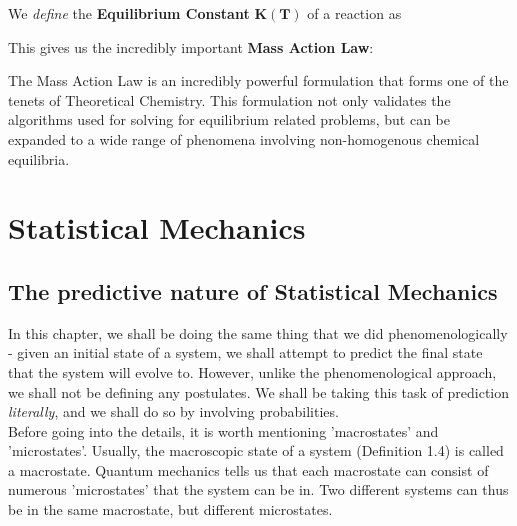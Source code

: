 \documentclass[oneside]{book}
\begin{document}
We \emph{define} the \textbf{Equilibrium Constant} $\bm{K(T)}$ of a reaction as
\begin{center}
\end{center}

This gives us the incredibly important \textbf{Mass Action Law}:
\begin{center}
\end{center}
The Mass Action Law is an incredibly powerful formulation that forms one of the tenets of Theoretical Chemistry. This formulation not only validates the algorithms used for solving for equilibrium related problems, but can be expanded to a wide range of phenomena involving non-homogenous chemical equilibria.



























\chapter{Statistical Mechanics}
\section{The predictive nature of Statistical Mechanics}
In this chapter, we shall be doing the same thing that we did phenomenologically - given an initial state of a system, we shall attempt to predict the final state that the system will evolve to. However, unlike the phenomenological approach, we shall not be defining any postulates. We shall be taking this task of prediction \emph{literally},  and we shall do so by involving probabilities.\\

Before going into the details, it is worth mentioning 'macrostates' and 'microstates'. Usually, the macroscopic state of a system (Definition 1.4)  is called a macrostate. Quantum mechanics tells us that each macrostate can consist of numerous 'microstates' that the system can be in. Two different systems can thus be in the same macrostate, but different microstates.\\
\end{document}
